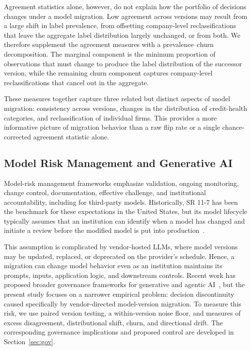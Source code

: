 \documentclass{ieeeaccess}
\begin{document}
Agreement statistics alone, however, do not explain how the portfolio of decisions changes under a model migration. Low agreement across versions may result from a large shift in label prevalence, from offsetting company-level reclassifications that leave the aggregate label distribution largely unchanged, or from both. We therefore supplement the agreement measures with a prevalence--churn decomposition. The marginal component is the minimum proportion of observations that must change to produce the label distribution of the successor version, while the remaining churn component captures company-level reclassifications that cancel out in the aggregate.

These measures together capture three related but distinct aspects of model migration: consistency across versions, changes in the distribution of credit-health categories, and reclassification of individual firms. This provides a more informative picture of migration behavior than a raw flip rate or a single chance-corrected agreement statistic alone.

\subsection{Model Risk Management and Generative AI}
Model-risk management frameworks emphasize validation, ongoing monitoring, change control, documentation, effective challenge, and institutional accountability, including for third-party models. Historically, SR 11-7 has been the benchmark for these expectations in the United States, but its model lifecycle typically assumes that an institution can identify when a model has changed and initiate a review before the modified model is put into production~\cite{sr117}.

This assumption is complicated by vendor-hosted LLMs, where model versions may be updated, replaced, or deprecated on the provider's schedule. Hence, a migration can change model behavior even as an institution maintains its prompts, inputs, application logic, and downstream controls. Recent work has proposed broader governance frameworks for generative and agentic AI~\cite{mrm}, but the present study focuses on a narrower empirical problem: decision discontinuity caused specifically by vendor-directed model-version migration. To measure this risk, we use paired version testing, a within-version noise floor, and measures of excess disagreement, distributional shift, churn, and directional drift. The corresponding governance implications and proposed control are developed in Section~\ref{sec:gov}.
\end{document}
